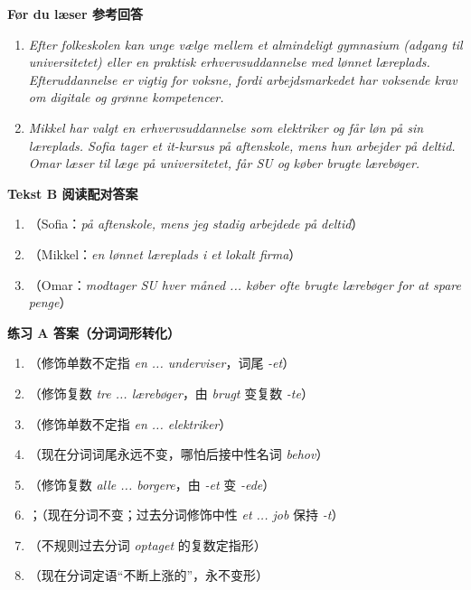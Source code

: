 \begin{answerbox}
\textbf{Før du læser 参考回答}
\begin{enumerate}
  \item \textit{Efter folkeskolen kan unge vælge mellem et almindeligt gymnasium (adgang til universitetet) eller en praktisk erhvervsuddannelse med lønnet læreplads. Efteruddannelse er vigtig for voksne, fordi arbejdsmarkedet har voksende krav om digitale og grønne kompetencer.}
  \item \textit{Mikkel har valgt en erhvervsuddannelse som elektriker og får løn på sin læreplads. Sofia tager et it-kursus på aftenskole, mens hun arbejder på deltid. Omar læser til læge på universitetet, får SU og køber brugte lærebøger.}
\end{enumerate}

\textbf{Tekst B 阅读配对答案}
\begin{enumerate}
  \item {}（Sofia：\textit{på aftenskole, mens jeg stadig arbejdede på deltid}）
  \item {}（Mikkel：\textit{en lønnet læreplads i et lokalt firma}）
  \item {}（Omar：\textit{modtager SU hver måned ... køber ofte brugte lærebøger for at spare penge}）
\end{enumerate}

\textbf{练习 A 答案（分词词形转化）}
\begin{enumerate}
  \item {}（修饰单数不定指 \textit{en ... underviser}，词尾 \textit{-et}）
  \item {}（修饰复数 \textit{tre ... lærebøger}，由 \textit{brugt} 变复数 \textit{-te}）
  \item {}（修饰单数不定指 \textit{en ... elektriker}）
  \item {}（现在分词词尾永远不变，哪怕后接中性名词 \textit{behov}）
  \item {}（修饰复数 \textit{alle ... borgere}，由 \textit{-et} 变 \textit{-ede}）
  \item {}；（现在分词不变；过去分词修饰中性 \textit{et ... job} 保持 \textit{-t}）
  \item {}（不规则过去分词 \textit{optaget} 的复数定指形）
  \item {}（现在分词定语“不断上涨的”，永不变形）
\end{enumerate}


\end{answerbox}
